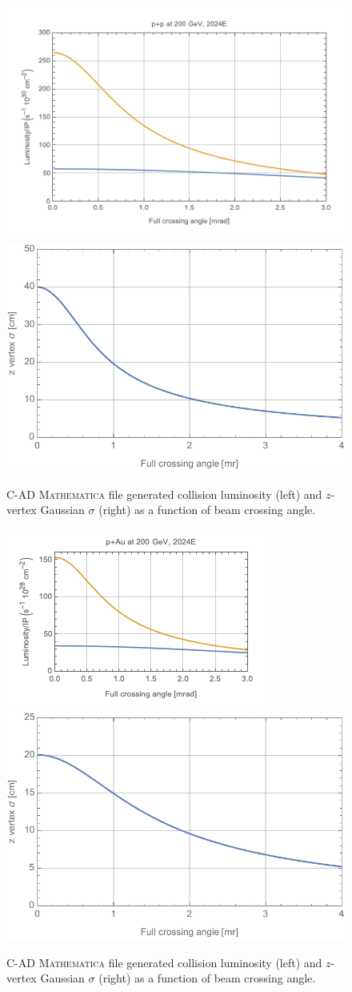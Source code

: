 \begin{figure}[h!]
    \centering
        \includegraphics[width=0.47\linewidth]{figs/figure_cad2_prelim.png}  
    \includegraphics[width=0.43\linewidth]{figs/pp200-2023-202008131-z.pdf}
    \caption{C-AD {\textsc{Mathematica}} file generated \pp collision luminosity (left) and $z$-vertex Gaussian $\sigma$ (right) as a function of beam crossing angle.}
    \label{fig:mathpp1}
\end{figure}

\begin{figure}[h!]
    \centering
        \includegraphics[width=0.47\linewidth]{figs/figure_cad3_prelim.png}  
    \includegraphics[width=0.43\linewidth]{figs/pau200-2024-202008140-z.pdf}
    \caption{C-AD {\textsc{Mathematica}} file generated \pau collision luminosity (left) and $z$-vertex Gaussian $\sigma$ (right) as a function of beam crossing angle.}
    \label{fig:mathpau1}
\end{figure}

